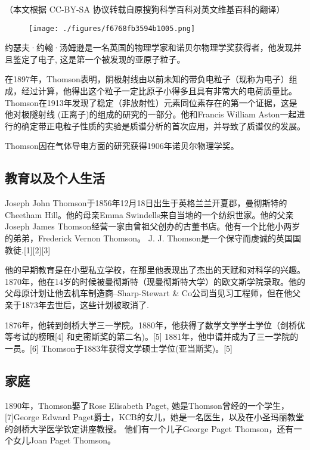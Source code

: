 
（本文根据 CC-BY-SA 协议转载自原搜狗科学百科对英文维基百科的翻译）

\begin{figure}[ht]
\centering
\texttt{[image: ./figures/f6768fb3594b1005.png]}
\caption \label{fig_Joseph_8}
\end{figure}

约瑟夫·约翰·汤姆逊是一名英国的物理学家和诺贝尔物理学奖获得者，他发现并且鉴定了电子, 这是第一个被发现的亚原子粒子。

在1897年，Thomson表明，阴极射线由以前未知的带负电粒子（现称为电子）组成，经过计算，他得出这个粒子一定比原子小得多且具有非常大的电荷质量比。 Thomson在1913年发现了稳定（非放射性）元素同位素存在的第一个证据，这是他对极隧射线 (正离子)的组成的研究的一部分。他和Francis William Aston一起进行的确定带正电粒子性质的实验是质谱分析的首次应用，并导致了质谱仪的发展。

Thomson因在气体导电方面的研究获得1906年诺贝尔物理学奖。

\subsection{教育以及个人生活}
Joseph John Thomson于1856年12月18日出生于英格兰兰开夏郡，曼彻斯特的Cheetham Hill。他的母亲Emma Swindells来自当地的一个纺织世家。他的父亲Joseph James Thomson经营一家由曾祖父创办的古董书店。他有一个比他小两岁的弟弟，Frederick Vernon Thomson。 J. J. Thomson是一个保守而虔诚的英国国教徒.[1][2][3]

他的早期教育是在小型私立学校，在那里他表现出了杰出的天赋和对科学的兴趣。1870年，他在14岁的时候被曼彻斯特（现曼彻斯特大学）的欧文斯学院录取。他的父母原计划让他去机车制造商--Sharp-Stewart & Co公司当见习工程师，但在他父亲于1873年去世后，这些计划被取消了.

1876年，他转到剑桥大学三一学院。1880年，他获得了数学文学学士学位（剑桥优等考试的榜眼[4] 和史密斯奖的第二名)。[5] 1881年，他申请并成为了三一学院的一员。[6] Thomson于1883年获得文学硕士学位(亚当斯奖)。[5]

\subsection{家庭}
1890年，Thomson娶了Rose Elisabeth Paget, 她是Thomson曾经的一个学生，[7]George Edward Paget爵士，KCB的女儿，她是一名医生，以及在小圣玛丽教堂的剑桥大学医学钦定讲座教授。 他们有一个儿子George Paget Thomson，还有一个女儿Joan Paget Thomson。

